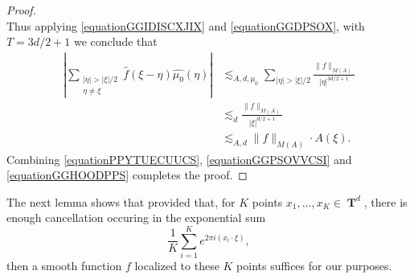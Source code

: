 \documentclass[12pt,reqno]{article}
\numberwithin{equation}{section}
\DeclareMathOperator{\TT}{\mathbf{T}}
\begin{document}
\begin{proof}
\begin{equation}
    \end{equation}
    Thus applying \eqref{equationGGIDISCXJIX} and \eqref{equationGGDPSOX}, with $T = 3d/2 + 1$ we conclude that
    \begin{equation} \label{equationGGHOODPPS}
    \begin{split}
        \left| \sum_{\substack{|\eta| > |\xi|/2\\ \eta \neq \xi}} \widehat{f}(\xi - \eta) \widehat{\mu_0}(\eta) \right| &\lesssim_{A,d,\mu_0} \sum_{|\eta| > |\xi|/2} \frac{\| f \|_{M(A)}}{|\eta|^{3d/2+1}}\\
        &\lesssim_d \frac{\| f \|_{M(A)}}{|\xi|^{d/2 + 1}}\\
        &\lesssim_{A,d} \| f \|_{M(A)} \cdot A(\xi). 
    \end{split}
    \end{equation}
    Combining \eqref{equationPPYTUECUUCS}, \eqref{equationGGPSOVVCSI} and \eqref{equationGGHOODPPS} completes the proof.
\end{proof}

The next lemma shows that provided that, for $K$ points $x_1, \dots, x_K \in \TT^d$, there is enough cancellation occuring in the exponential sum
%
\[ \frac{1}{K} \sum_{i = 1}^K e^{2 \pi i (x_i \cdot \xi)}, \]
%
then a smooth function $f$ localized to these $K$ points suffices for our purposes.
\end{document}
